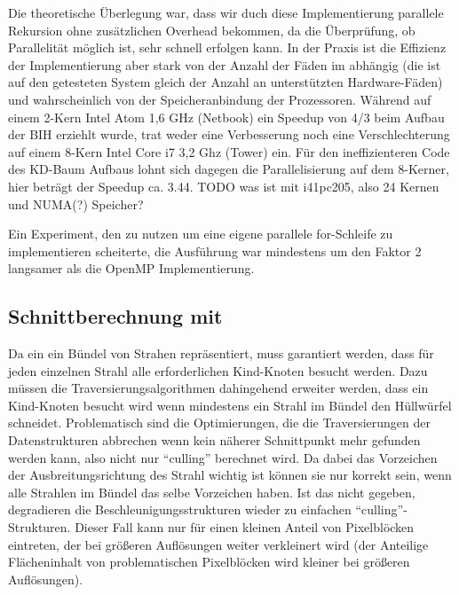Die theoretische Überlegung war, dass wir duch diese Implementierung parallele Rekursion ohne zusätzlichen Overhead bekommen, da die Überprüfung, ob Parallelität möglich ist, sehr schnell erfolgen kann. In der Praxis ist die Effizienz der Implementierung aber stark von der Anzahl der Fäden im  abhängig (die ist auf den getesteten System gleich der Anzahl an unterstützten Hardware-Fäden) und wahrscheinlich von der Speicheranbindung der Prozessoren. Während auf einem 2-Kern Intel Atom 1,6 GHz (Netbook) ein Speedup von 4/3 beim Aufbau der BIH erziehlt wurde, trat weder eine Verbesserung noch eine Verschlechterung auf einem 8-Kern Intel Core i7 3,2 Ghz (Tower) ein. Für den ineffizienteren Code des KD-Baum Aufbaus lohnt sich dagegen die Parallelisierung auf dem 8-Kerner, hier beträgt der Speedup ca. 3.44. TODO was ist mit i41pc205, also 24 Kernen und NUMA(?) Speicher?

Ein Experiment, den  zu nutzen um eine eigene parallele for-Schleife zu implementieren scheiterte, die Ausführung war mindestens um den Faktor 2 langsamer als die OpenMP Implementierung.

\subsection{Schnittberechnung mit }
\label{ssec:accel-intersect-sseray}

Da ein  ein Bündel von Strahen repräsentiert, muss garantiert werden, dass für jeden einzelnen Strahl alle erforderlichen Kind-Knoten besucht werden. Dazu müssen die Traversierungsalgorithmen dahingehend erweiter werden, dass ein Kind-Knoten besucht wird wenn mindestens ein Strahl im Bündel den Hüllwürfel schneidet. Problematisch sind die Optimierungen, die die Traversierungen der Datenstrukturen abbrechen wenn kein näherer Schnittpunkt mehr gefunden werden kann, also nicht nur "`culling"' berechnet wird. Da dabei das Vorzeichen der Ausbreitungsrichtung des Strahl wichtig ist können sie nur korrekt sein, wenn alle Strahlen im Bündel das selbe Vorzeichen haben. Ist das nicht gegeben, degradieren die Beschleunigungsstrukturen wieder zu einfachen "`culling"'-Strukturen. Dieser Fall kann nur für einen kleinen Anteil von Pixelblöcken eintreten, der bei größeren Auflösungen weiter verkleinert wird (der Anteilige Flächeninhalt von problematischen Pixelblöcken wird kleiner bei größeren Auflösungen).

